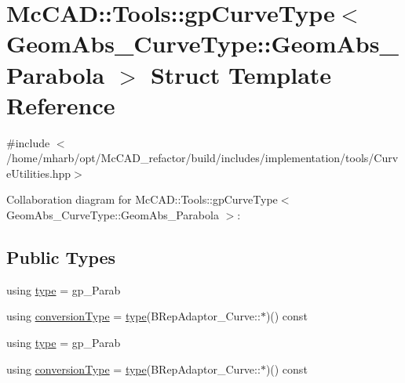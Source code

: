 \hypertarget{structMcCAD_1_1Tools_1_1gpCurveType_3_01GeomAbs__CurveType_1_1GeomAbs__Parabola_01_4}{}\section{Mc\+C\+AD\+:\+:Tools\+:\+:gp\+Curve\+Type$<$ Geom\+Abs\+\_\+\+Curve\+Type\+:\+:Geom\+Abs\+\_\+\+Parabola $>$ Struct Template Reference}
\label{structMcCAD_1_1Tools_1_1gpCurveType_3_01GeomAbs__CurveType_1_1GeomAbs__Parabola_01_4}


{\ttfamily \#include $<$/home/mharb/opt/\+Mc\+C\+A\+D\+\_\+refactor/build/includes/implementation/tools/\+Curve\+Utilities.\+hpp$>$}



Collaboration diagram for Mc\+C\+AD\+:\+:Tools\+:\+:gp\+Curve\+Type$<$ Geom\+Abs\+\_\+\+Curve\+Type\+:\+:Geom\+Abs\+\_\+\+Parabola $>$\+:
\subsection*{Public Types}
\begin{DoxyCompactItemize}
\item 
using \hyperlink{structMcCAD_1_1Tools_1_1gpCurveType_3_01GeomAbs__CurveType_1_1GeomAbs__Parabola_01_4_a6f841cf7a5c058b9171c9c99ccf84985}{type} = gp\+\_\+\+Parab
\item 
using \hyperlink{structMcCAD_1_1Tools_1_1gpCurveType_3_01GeomAbs__CurveType_1_1GeomAbs__Parabola_01_4_a39895972416d7cbcd11ba78c5dd3d745}{conversion\+Type} = \hyperlink{structMcCAD_1_1Tools_1_1gpCurveType_3_01GeomAbs__CurveType_1_1GeomAbs__Parabola_01_4_a6f841cf7a5c058b9171c9c99ccf84985}{type}(B\+Rep\+Adaptor\+\_\+\+Curve\+::$\ast$)() const
\item 
using \hyperlink{structMcCAD_1_1Tools_1_1gpCurveType_3_01GeomAbs__CurveType_1_1GeomAbs__Parabola_01_4_a6f841cf7a5c058b9171c9c99ccf84985}{type} = gp\+\_\+\+Parab
\item 
using \hyperlink{structMcCAD_1_1Tools_1_1gpCurveType_3_01GeomAbs__CurveType_1_1GeomAbs__Parabola_01_4_a39895972416d7cbcd11ba78c5dd3d745}{conversion\+Type} = \hyperlink{structMcCAD_1_1Tools_1_1gpCurveType_3_01GeomAbs__CurveType_1_1GeomAbs__Parabola_01_4_a6f841cf7a5c058b9171c9c99ccf84985}{type}(B\+Rep\+Adaptor\+\_\+\+Curve\+::$\ast$)() const
\end{DoxyCompactItemize}
